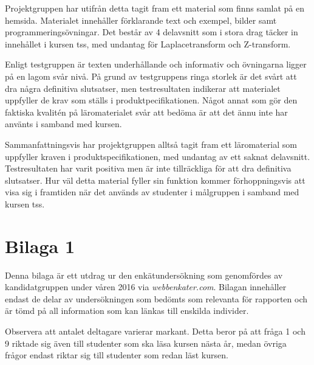 \documentclass[12pt,a4paper,twoside,openright]{article}
\begin{document}
Projektgruppen har utifrån detta tagit fram ett material som finns
samlat på en hemsida. Materialet innehåller förklarande text och
exempel, bilder samt programmeringsövningar. Det består av 4
delavsnitt som i stora drag täcker in innehållet i kursen
\gls{tss}, med undantag för Laplacetransform och Z-transform.

Enligt testgruppen är texten underhållande och informativ och
övningarna ligger på en lagom svår nivå. På grund av testgruppens
ringa storlek är det svårt att dra några definitiva slutsatser, men
testresultaten indikerar att materialet uppfyller de krav som ställs i
produktpecifikationen. Något annat som gör den faktiska kvalitén på
läromaterialet svår att bedöma är att det ännu inte har använts i
samband med kursen.

Sammanfattningsvis har projektgruppen alltså tagit fram ett
läromaterial som uppfyller kraven i produktspecifikationen, med
undantag av ett saknat delavsnitt. Testresultaten har varit positiva
men är inte tillräckliga för att dra definitiva slutsatser. Hur väl detta
material fyller sin funktion kommer förhoppningsvis att visa sig i
framtiden när det används av studenter i målgruppen i samband med
kursen \gls{tss}.

\newpage

\setlength{\bibitemsep}{3mm}
\printbibliography

\newpage

\appendix


\section{Bilaga 1}
\label{bil:1}
Denna bilaga är ett utdrag ur den enkätundersökning som genomfördes av
kandidatgruppen under våren 2016 via \textit{webbenkater.com}. Bilagan
innehåller endast de delar av undersökningen som bedömts som relevanta
för rapporten och är tömd på all information som kan länkas till
enskilda individer.

Observera att antalet deltagare varierar markant. Detta beror på att
fråga 1 och 9 riktade sig även till studenter som ska läsa kursen
nästa år, medan övriga frågor endast riktar sig till studenter som
redan läst kursen.
\end{document}

